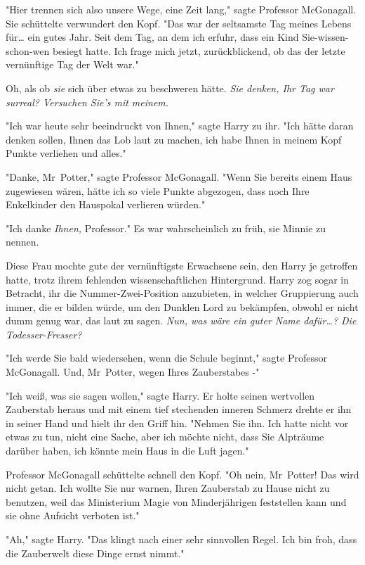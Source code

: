 {"Hier trennen sich also unsere Wege, eine Zeit lang," sagte Professor McGonagall. Sie schüttelte verwundert den Kopf. "Das war der seltsamste Tag meines Lebens für… ein gutes Jahr. Seit dem Tag, an dem ich erfuhr, dass ein Kind Sie-wissen-schon-wen besiegt hatte. Ich frage mich jetzt, zurückblickend, ob das der letzte vernünftige Tag der Welt war."

Oh, als ob \emph{sie} sich über etwas zu beschweren hätte. \emph{Sie denken, Ihr Tag war surreal? Versuchen Sie's mit meinem.}

"Ich war heute sehr beeindruckt von Ihnen," sagte Harry zu ihr. "Ich hätte daran denken sollen, Ihnen das Lob laut zu machen, ich habe Ihnen in meinem Kopf Punkte verliehen und alles."

"Danke, Mr~Potter," sagte Professor McGonagall. "Wenn Sie bereits einem Haus zugewiesen wären, hätte ich so viele Punkte abgezogen, dass noch Ihre Enkelkinder den Hauspokal verlieren würden."

"Ich danke \emph{Ihnen,} Professor." Es war wahrscheinlich zu früh, sie Minnie zu nennen.

Diese Frau mochte gute der vernünftigste Erwachsene sein, den Harry je getroffen hatte, trotz ihrem fehlenden wissenschaftlichen Hintergrund. Harry zog sogar in Betracht, ihr die Nummer-Zwei-Position anzubieten, in welcher Gruppierung auch immer, die er bilden würde, um den Dunklen Lord zu bekämpfen, obwohl er nicht dumm genug war, das laut zu sagen. \emph{Nun, was wäre ein guter Name dafür…? Die Todesser-Fresser?}

"Ich werde Sie bald wiedersehen, wenn die Schule beginnt," sagte Professor McGonagall. Und, Mr~Potter, wegen Ihres Zauberstabes -"

"Ich weiß, was sie sagen wollen," sagte Harry. Er holte seinen wertvollen Zauberstab heraus und mit einem tief stechenden inneren Schmerz drehte er ihn in seiner Hand und hielt ihr den Griff hin. "Nehmen Sie ihn. Ich hatte nicht vor etwas zu tun, nicht eine Sache, aber ich möchte nicht, dass Sie Alpträume darüber haben, ich könnte mein Haus in die Luft jagen."

Professor McGonagall schüttelte schnell den Kopf. "Oh nein, Mr~Potter! Das wird nicht getan. Ich wollte Sie nur warnen, Ihren Zauberstab zu Hause nicht zu benutzen, weil das Ministerium Magie von Minderjährigen feststellen kann und sie ohne Aufsicht verboten ist."

"Ah," sagte Harry. "Das klingt nach einer sehr sinnvollen Regel. Ich bin froh, dass die Zauberwelt diese Dinge ernst nimmt."

}
